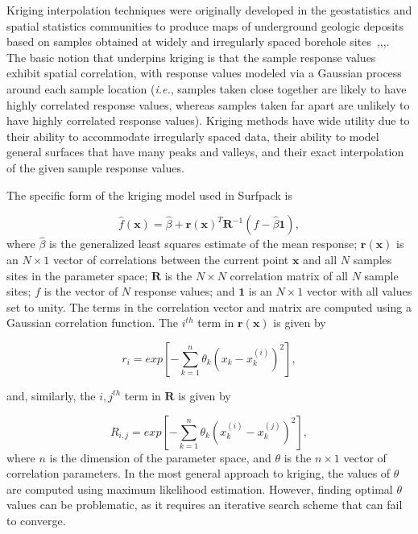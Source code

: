 \documentclass{article}
\begin{document}
Kriging interpolation techniques were originally developed in the geostatistics and spatial statistics communities to produce maps of underground geologic deposits based on samples obtained at widely and irregularly spaced borehole sites~\cite{giunta},\cite{romero},\cite{koehler},\cite{cressie}.  The basic notion that underpins kriging is that the sample response values exhibit spatial correlation, with response values modeled via a Gaussian process around each sample location ({\em i.e.}, samples taken close together are likely to have highly correlated response values, whereas samples taken far apart are unlikely to have highly correlated response values).  Kriging methods have wide utility due to their ability to accommodate irregularly spaced data, their ability to model general surfaces that have many peaks and valleys, and their exact interpolation of the given sample response values. 

The specific form of the kriging model used in Surfpack is 

\begin{equation}
  \hat{f}(\mathbf{x}) = \hat{\beta} + \mathbf{r}(\mathbf{x})^{T}\mathbf{R}^{-1}(f-\hat{\beta}\mathbf{1}),
\end{equation}
where $\hat{\beta}$ is the generalized least squares estimate of the mean response; $\mathbf{r}(\mathbf{x})$ is an $N \times 1$ vector of correlations between the current point $\mathbf{x}$ and all $N$ samples sites in the parameter space; $\mathbf{R}$ is the $N \times N$ correlation matrix of all $N$ sample sites; $f$ is the vector of $N$ response values; and $\mathbf{1}$ is an $N \times 1$ vector with all values set to unity.  The terms in the correlation vector and matrix are computed using a Gaussian correlation function.  The $i^{th}$ term in $\mathbf{r}(\mathbf{x})$ is given by

\begin{equation}
  r_i = exp\left[ -\sum_{k=1}^n{ \theta_k \left( x_k - x_k^{(i)} \right) ^2}\right],
\end{equation}

and, similarly, the $i,j^{th}$ term in $\mathbf{R}$ is given by

\begin{equation}
  R_{i,j} = exp\left[-\sum_{k=1}^n{ \theta_k \left( x_k^{(i)} - x_k^{(j)} \right) ^2}\right],
 \label{equation:distance}
\end{equation}
where $n$ is the dimension of the parameter space, and $\theta$ is the $n \times 1$ vector of correlation parameters.  In the most general approach to kriging, the values of $\theta$ are computed using maximum likelihood estimation.  However, finding optimal $\theta$ values can be problematic, as it requires an iterative search scheme that can fail to converge.
\end{document}
